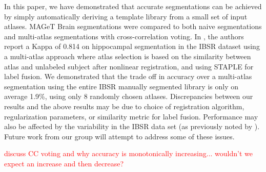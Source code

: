 \documentclass{article}
\newcommand{\todo}[1]{
    \textcolor{red}{#1}
}
\begin{document}
In this paper, we have demonstrated that accurate segmentations can be
achieved by simply automatically deriving a template library from a small
set of input atlases.  MAGeT Brain segmentations were compared to both
naive segmentations and multi-atlas segmentations with cross-correlation
voting.  In \cite{Lotjonen2010}, the authors report a Kappa of 0.814 on
hippocampal segmentation in the IBSR dataset using a multi-atlas approach
where atlas selection is based on the similarity between atlas and
unlabeled subject after nonlinear registration, and using STAPLE
\cite{Warfield2004} for label fusion.  We demonstrated that the trade off
in accuracy over a multi-atlas segmentation using the entire IBSR manually
segmented library is only on average 1.9\%, using only 8 randomly chosen
atlases.  Discrepancies between our results and the above results may be
due to choice of registration algorithm, regularization parameters, or
similarity metric for label fusion.  Performance may also be affected by
the variability in the IBSR data set (as previously noted by
\cite{Klein2009}).  Future work from our group will attempt to address some
of these issues.

\todo{discuss CC voting and why accuracy is monotonically increasing...
wouldn't we expect an increase and then decrease?}



\end{document}
